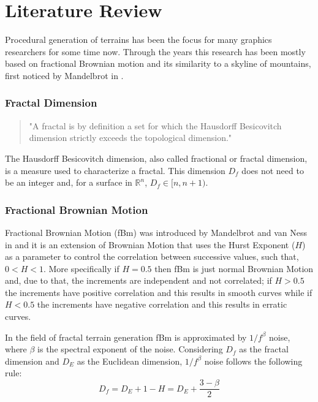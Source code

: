 \chapter{Literature Review}

Procedural generation of terrains has been the focus for many graphics researchers for some time now. Through the years this research has been mostly based on fractional Brownian motion and its similarity to a skyline of mountains, first noticed by Mandelbrot in \cite{Mandelbrot1983}. 



\subsection{Fractal Dimension}

\begin{quotation}
	"A fractal is by definition a set for which the Hausdorff Besicovitch dimension strictly exceeds the topological dimension." \cite[p.15]{Mandelbrot1983}
\end{quotation}

The Hausdorff Besicovitch dimension, also called fractional or fractal dimension, is a measure used to characterize a fractal. This dimension $ D_f $ does not need to be an integer and, for a surface in $ \mathbb{R}^n $, $ D_f \in [n, n+1)$.

\subsection{Fractional Brownian Motion}

Fractional Brownian Motion (fBm) was introduced by Mandelbrot and van Ness in \cite{Mandelbrot1968} and it is an extension of Brownian Motion that uses the Hurst Exponent ($H$) as a parameter to control the correlation between successive values, such that, $ 0 < H < 1 $. More specifically if $H = 0.5$ then fBm is just normal Brownian Motion and, due to that, the increments are independent and not correlated; if $H > 0.5$ the increments have positive correlation and this results in smooth curves while if $H < 0.5$ the increments have negative correlation and this results in erratic curves. \cite{Musgrave1993}

In the field of fractal terrain generation fBm is approximated by $1/f^\beta$ noise, where $\beta$ is the spectral exponent of the noise. Considering $D_f$ as the fractal dimension and $D_E$ as the Euclidean dimension, $1/f^\beta$ noise follows the following rule:
\[
D_f = D_E + 1 - H = D_E + \frac{3-\beta}{2}
\]

